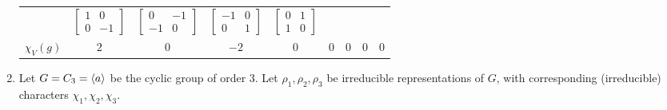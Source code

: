 \begin{boxexample}
\begin{enumerate}
\begin{table}[H]
\begin{tabular}{|c||c|c|c|c|c|c|c|c|}
                &
                $\begin{bmatrix} 1 & 0 \\ 0 & -1 \end{bmatrix}$
                &
                $\begin{bmatrix} 0 & -1 \\ -1 & 0 \end{bmatrix}$
                &
                $\begin{bmatrix} -1 & 0 \\ 0 & 1 \end{bmatrix}$
                &
                $\begin{bmatrix} 0 & 1 \\ 1 & 0 \end{bmatrix}$
                \\
                $\chi_V(g)$ & $2$ & $0$ & $-2$ & $0$ & $0$ & $0$ & $0$ & $0$ \\
                \hline
            \end{tabular}
        \end{table}

        \item Let $G = C_3 = \left\langle a \right\rangle$ be the cyclic group of order $3$. Let $\rho_1, \rho_2, \rho_3$ be irreducible representations of $G$, with corresponding (irreducible) characters $\chi_1, \chi_2, \chi_3$.
    \end{enumerate}
\end{boxexample}
